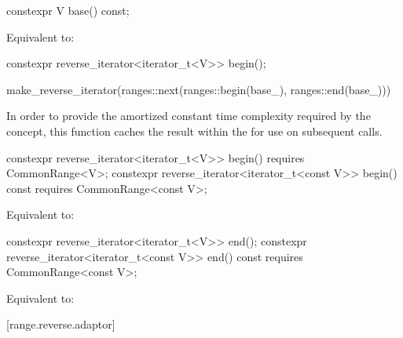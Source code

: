%
\begin{itemdecl}
constexpr V base() const;
\end{itemdecl}

\begin{itemdescr}
\pnum
\effects Equivalent to: 
\end{itemdescr}

%
\begin{itemdecl}
constexpr reverse_iterator<iterator_t<V>> begin();
\end{itemdecl}

\begin{itemdescr}
\pnum
\returns
\begin{codeblock}
make_reverse_iterator(ranges::next(ranges::begin(base_), ranges::end(base_)))
\end{codeblock}

\pnum
\remarks In order to provide the amortized constant time complexity required by
the  concept, this function caches the result within the
 for use on subsequent calls.
\end{itemdescr}

%
\begin{itemdecl}
constexpr reverse_iterator<iterator_t<V>> begin() requires CommonRange<V>;
constexpr reverse_iterator<iterator_t<const V>> begin() const
  requires CommonRange<const V>;
\end{itemdecl}

\begin{itemdescr}
\pnum
\effects Equivalent to: 
\end{itemdescr}

%
\begin{itemdecl}
constexpr reverse_iterator<iterator_t<V>> end();
constexpr reverse_iterator<iterator_t<const V>> end() const
  requires CommonRange<const V>;
\end{itemdecl}

\begin{itemdescr}
\pnum
\effects Equivalent to: 
\end{itemdescr}

[range.reverse.adaptor]{}

